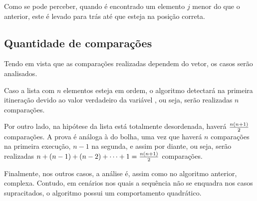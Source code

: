 Como se pode perceber, quando é encontrado um elemento $j$ menor do que o anterior, este é levado para trás até que esteja na posição correta.

\subsection{Quantidade de comparações}
Tendo em vista que as comparações realizadas dependem do vetor, os casos serão analisados. 

Caso a lista com $n$ elementos esteja em ordem, o algoritmo detectará na primeira itineração devido ao valor verdadeiro da variável , ou seja, serão realizadas $n$ comparações.

Por outro lado, na hipótese da lista está totalmente desordenada, haverá $n(n+1)\over 2$ comparações. A prova é análoga à do bolha, uma vez que haverá $n$ comparações na primeira execução, $n-1$ na segunda, e assim por diante, ou seja, serão realizadas $n + (n-1)+(n-2)+\cdots+1 = {n(n+1)\over 2}$ comparações.

Finalmente, nos outros casos, a análise é, assim como no algoritmo anterior, complexa. Contudo, em cenários nos quais a sequência não se enquadra nos casos supracitados, o algoritmo possui um comportamento quadrático\cite{insertioncomplexity}.